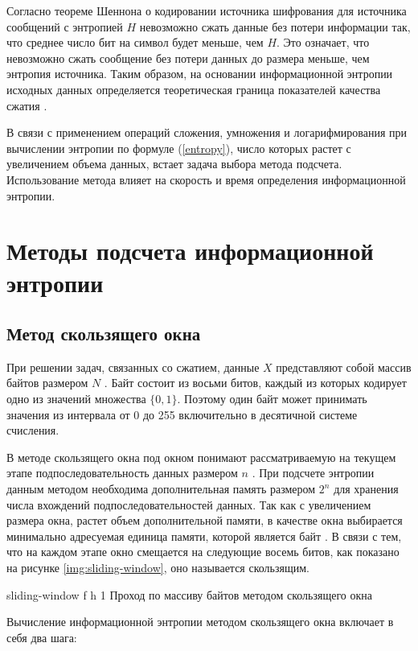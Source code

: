 Согласно теореме Шеннона о кодировании источника шифрования для источника сообщений с энтропией $H$ невозможно сжать данные без потери информации так, что среднее число бит на символ будет меньше, чем $H$. Это означает, что невозможно сжать сообщение без потери данных до размера меньше, чем энтропия источника. Таким образом, на основании информационной энтропии исходных данных определяется теоретическая граница показателей качества сжатия \cite{theorem}.

В связи с применением операций сложения, умножения и логарифмирования при вычислении энтропии по формуле (\ref{entropy}), число которых растет с увеличением объема данных, встает задача выбора метода подсчета. Использование метода влияет на скорость и время определения информационной энтропии.

\section{Методы подсчета информационной энтропии}

\subsection{Метод скользящего окна}\label{sliding-window}

При решении задач, связанных со сжатием, данные $X$ представляют собой массив байтов размером $N$ \cite{bytes}. Байт состоит из восьми битов, каждый из которых кодирует одно из значений множества $\{0, 1\}$. Поэтому один байт может принимать значения из интервала от 0 до 255 включительно в десятичной системе счисления. 

В методе скользящего окна под окном понимают рассматриваемую на текущем этапе подпоследовательность данных размером $n$ \cite{sliding-window-method}. При подсчете энтропии данным методом необходима дополнительная память размером $2^n$ для хранения числа вхождений подпоследовательностей данных. Так как с увеличением размера окна, растет объем дополнительной памяти, в качестве окна выбирается минимально адресуемая единица памяти, которой является байт \cite{memory-unit}. В связи с тем, что на каждом этапе окно смещается на следующие восемь битов, как показано на рисунке \ref{img:sliding-window}, оно называется скользящим.

    {sliding-window}
    {f}
    {h}
    {1\textwidth}
    {Проход по массиву байтов методом скользящего окна}
    
Вычисление информационной энтропии методом скользящего окна включает в себя два шага:

